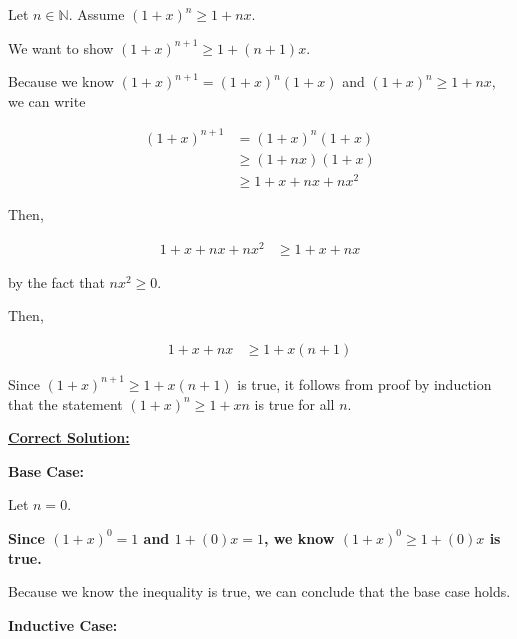 \documentclass[12pt]{article}
\begin{document}
\begin{enumerate}[a.]
    Let $n \in \mathbb{N}$. Assume $(1+x)^n \geq 1 + nx$.

    \bigskip

    We want to show $(1+x)^{n+1} \geq 1 + (n+1)x$.

    \bigskip

    Because we know $(1 + x)^{n+1} = (1+x)^n(1+x)$ and $(1+x)^n \geq 1 + nx$, we
    can write

    \begin{align}
        (1+x)^{n+1} &= (1+x)^n(1+x)\\
        &\geq (1+nx)(1+x)\\
        &\geq 1 + x + nx + nx^2
    \end{align}

    \bigskip

    Then,

    \begin{align}
        1 + x + nx + nx^2 &\geq 1 + x + nx
    \end{align}

    by the fact that $nx^2 \geq 0$.

    \bigskip

    Then,

    \begin{align}
        1 + x + nx &\geq 1 + x(n+1)
    \end{align}

    \bigskip

    Since $(1+x)^{n+1} \geq 1 + x(n+1)$ is true, it follows from proof by
    induction that the statement $(1+x)^n \geq 1 + xn$ is true for all $n$.

    \begin{mdframed}
        \underline{\textbf{Correct Solution:}}

        \bigskip

        \textbf{Base Case:}

        \bigskip

        Let $n = 0$.

        \bigskip
        \color{red}
        \textbf{Since $(1 + x)^0 = 1$ and $1 + (0)x = 1$, we know $(1+x)^0 \geq 1 + (0)x$ is true.}
        \color{black}

        Because we know the inequality is true, we can conclude that the base case holds.

        \bigskip

        \textbf{Inductive Case:}

        \bigskip


\end{mdframed}
\end{enumerate}
\end{document}

